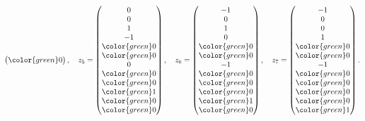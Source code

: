 \begin{loesung}
\[\begin{pmatrix}
\color{green} 0
\end{pmatrix}
,\quad
z_5=
\begin{pmatrix}
              0\\
              0\\
              1\\
             -1\\
\color{green} 0\\
\color{green} 0\\
              0\\
\color{green} 0\\
\color{green} 0\\
\color{green} 1\\
\color{green} 0\\
\color{green} 0
\end{pmatrix}
,\quad
z_6=\begin{pmatrix}
             -1\\
              0\\
              1\\
              0\\
\color{green} 0\\
\color{green} 0\\
             -1\\
\color{green} 0\\
\color{green} 0\\
\color{green} 0\\
\color{green} 1\\
\color{green} 0
\end{pmatrix}
,\quad
z_7=\begin{pmatrix}
             -1\\
              0\\
              0\\
              1\\
\color{green} 0\\
\color{green} 0\\
             -1\\
\color{green} 0\\
\color{green} 0\\
\color{green} 0\\
\color{green} 0\\
\color{green} 1
\end{pmatrix}.
\]

\end{loesung}
